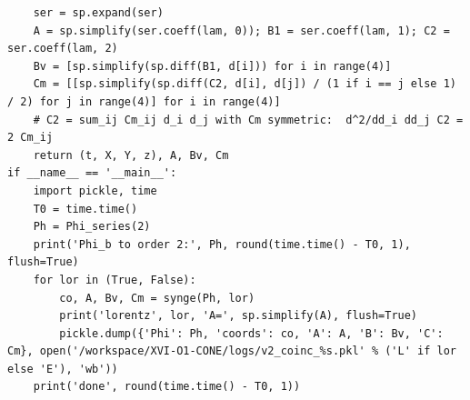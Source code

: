 \documentclass[10pt]{article}
\begin{document}
\begin{lstlisting}
    ser = sp.expand(ser)
    A = sp.simplify(ser.coeff(lam, 0)); B1 = ser.coeff(lam, 1); C2 = ser.coeff(lam, 2)
    Bv = [sp.simplify(sp.diff(B1, d[i])) for i in range(4)]
    Cm = [[sp.simplify(sp.diff(C2, d[i], d[j]) / (1 if i == j else 1) / 2) for j in range(4)] for i in range(4)]
    # C2 = sum_ij Cm_ij d_i d_j with Cm symmetric:  d^2/dd_i dd_j C2 = 2 Cm_ij
    return (t, X, Y, z), A, Bv, Cm
if __name__ == '__main__':
    import pickle, time
    T0 = time.time()
    Ph = Phi_series(2)
    print('Phi_b to order 2:', Ph, round(time.time() - T0, 1), flush=True)
    for lor in (True, False):
        co, A, Bv, Cm = synge(Ph, lor)
        print('lorentz', lor, 'A=', sp.simplify(A), flush=True)
        pickle.dump({'Phi': Ph, 'coords': co, 'A': A, 'B': Bv, 'C': Cm}, open('/workspace/XVI-O1-CONE/logs/v2_coinc_%s.pkl' % ('L' if lor else 'E'), 'wb'))
    print('done', round(time.time() - T0, 1))
\end{lstlisting}
\end{document}
